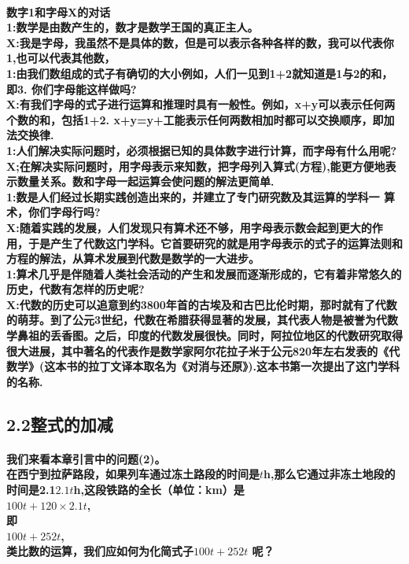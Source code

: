 \documentclass[UTF8]{report}
\theoremstyle{definition}
\theoremstyle{remark}
\begin{document}
\paragraph{数字1和字母X的对话\\1:数学是由数产生的，数才是数学王国的真正主人。\\X:我是字母，我虽然不是具体的数，但是可以表示各种各样的数，我可以代表你1,也可以代表其他数，\\1:由我们数组成的式子有确切的大小例如，人们一见到1+2就知道是1与2的和，即3. 你们字母能这样做吗?\\X:有我们字母的式子进行运算和推理时具有一般性。例如，x+y可以表示任何两个数的和，包括1+2. x+y=y+工能表示任何两数相加时都可以交换顺序，即加法交换律.\\1:人们解决实际问题时，必须根据已知的具体数字进行计算，而字母有什么用呢?X;在解决实际问题时，用字母表示来知数，把字母列入算式(方程),能更方便地表示数量关系。数和字母一起运算会使问题的解法更简单.\\1:数是人们经过长期实践创造出来的，并建立了专门研究数及其运算的学科一 算术，你们字母行吗?\\X:随着实践的发展，人们发现只有算术还不够，用字母表示数会起到更大的作用，于是产生了代数这门学科。它首要研究的就是用字母表示的式子的运算法则和方程的解法，从算术发展到代数是数学的一大进步。\\1:算术几乎是伴随着人类社会活动的产生和发展而逐渐形成的，它有着非常悠久的历史，代数有怎样的历史呢?\\X:代数的历史可以追意到约3800年首的古埃及和古巴比伦时期，那时就有了代数的萌芽。到了公元3世纪，代数在希腊获得显著的发展，其代表人物是被誉为代数学鼻祖的丢香图。之后，印度的代数发展很快。同时，阿拉位地区的代数研究取得很大进展，其中著名的代表作是数学家阿尔花拉子米于公元820年左右发表的《代数学》(这本书的拉丁文译本取名为《对消与还原》).这本书第一次提出了这门学科的名称.}
\subsection*{2.2整式的加减}
\paragraph{我们来看本章引言中的问题(2)。\\在西宁到拉萨路段，如果列车通过冻土路段的时间是$t$h,那么它通过非冻土地段的时间是2.1$2.1t$h,这段铁路的全长（单位：km）是\\$100t+120\times2.1t$,\\ 即\\$100t+252t$,\\ 类比数的运算，我们应如何为化简式子$100t+252t$ 呢？}
\end{document}
